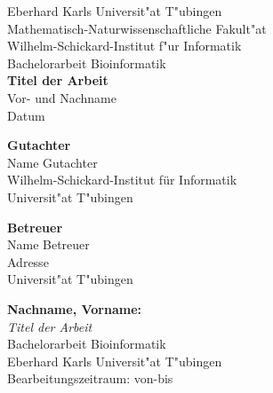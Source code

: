 \documentclass[twoside,12pt,a4paper]{report}
\begin{document}
 
\begin{titlepage}
 \begin{center}
  {\LARGE Eberhard Karls Universit"at T"ubingen}\\
  {\large Mathematisch-Naturwissenschaftliche Fakult"at \\
Wilhelm-Schickard-Institut f"ur Informatik\\[4cm]}
  {\huge Bachelorarbeit Bioinformatik\\[2cm]}
  {\Large\bf  Titel der Arbeit\\[1.5cm]}
 {\large Vor- und Nachname}\\[0.5cm]
Datum\\[3cm]
\begin{center}{\small\bf Gutachter}\\[0.5cm]
{\large Name Gutachter}\\
  {\footnotesize Wilhelm-Schickard-Institut f\"ur Informatik\\
	Universit"at T"ubingen}	\end{center}
	
	
\begin{center}
{\small\bf Betreuer}\\[0.5cm]
{\large Name Betreuer}\\
  {\footnotesize Adresse\\
	Universit"at T"ubingen}\end{center}
	
  \end{center}
\end{titlepage}


\thispagestyle{empty}
\vspace*{\fill}
\begin{minipage}{11.2cm}
\textbf{Nachname, Vorname:}\\
\emph{Titel der Arbeit}\\ Bachelorarbeit Bioinformatik\\
Eberhard Karls Universit"at T"ubingen\\
Bearbeitungszeitraum: von-bis
\end{minipage}
\newpage
\end{document}

